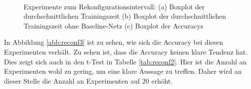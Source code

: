 \begin{figure}
     \centering
     \hfill
     \\
     \caption{Experimente zum Rekonfigurationsintervall: (a) Boxplot der durchschnittlichen Trainingszeit (b) Boxplot der durchschnittlichen Trainingszeit ohne Baseline-Netz (c) Boxplot der Accuracys}
     \label{abb:reconf}
\end{figure}

In Abbildung \ref{abb:reconf3} ist zu sehen, wie sich die Accuracy bei diesen Experimenten verhält. Zu sehen ist, dass die Accuracy keinen klare Tendenz hat. Dies zeigt sich auch in den t-Test in Tabelle \ref{tab:reconf2}. Hier ist die Anzahl an Experimenten wohl zu gering, um eine klare Aussage zu treffen. Daher wird an dieser Stelle die Anzahl an Experimenten auf 20 erhöht. 



